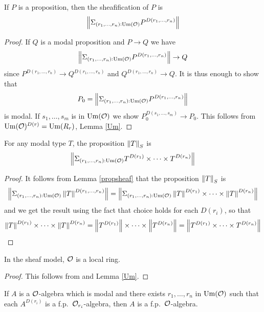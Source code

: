     \begin{lemma}\label{propsheaf}
      If $P$ is a proposition, then the sheafification of $P$ is
      $$\left\lVert \Sigma_{(r_1,\dots,r_n):\mathrm{Um}(\mathcal O)}P^{D(r_1,\dots,r_n)} \right\rVert$$
    \end{lemma}
    
    \begin{proof}
      If $Q$ is a modal proposition and $P\rightarrow Q$ we have
      $$\left\lVert \Sigma_{(r_1,\dots,r_n):\mathrm{Um}(\mathcal O)}P^{D(r_1,\dots,r_n)} \right\rVert\rightarrow Q$$
      since
      $P^{D(r_1,\dots,r_n)}\rightarrow Q^{D(r_1,\dots,r_n)}$ and $Q^{D(r_1,\dots,r_n)}\rightarrow Q$.
      It is thus enough to show that
      $$P_0 = \left\lVert \Sigma_{(r_1,\dots,r_n):\mathrm{Um}(\mathcal O)}P^{D(r_1,\dots,r_n)} \right\rVert$$
      is modal.
      If $s_1,\dots,s_m$ is in $\mathrm{Um}(\mathcal O)$ we show $P_0^{D(s_1,\dots,s_m)}\rightarrow P_0$. This follows
      from $\mathrm{Um}(\mathcal O)^{D(r)} = \mathrm{Um}(R_r)$, Lemma \ref{Um}.
    \end{proof}
    

    \begin{proposition}\label{norm}
      For any modal type $T$, the proposition $\left\lVert T \right\rVert_S$ is
      $$\left\lVert \Sigma_{(r_1,\dots,r_n):\mathrm{Um}(\mathcal O)}T^{D(r_1)}\times\dots\times T^{D(r_n)} \right\rVert$$
    \end{proposition}
    
    \begin{proof}
      It follows from Lemma \ref{propsheaf} that the proposition $\left\lVert T \right\rVert_S$ is
      $$\left\lVert \Sigma_{(r_1,\dots,r_n):\mathrm{Um}(\mathcal O)}\left\lVert T \right\rVert^{D(r_1,\dots,r_n)} \right\rVert = \left\lVert \Sigma_{(r_1,\dots,r_n):\mathrm{Um}(\mathcal O)}\left\lVert T \right\rVert^{D(r_1)}\times\dots\times\left\lVert T \right\rVert^{D(r_n)} \right\rVert$$
      and we get the result using the fact that choice holds for each $D(r_i)$, so that
      \[\left\lVert T \right\rVert^{D(r_1)}\times\dots\times\left\lVert T \right\rVert^{D(r_n)} = \left\lVert T^{D(r_1)} \right\rVert\times\dots\times\left\lVert T^{D(r_n)} \right\rVert =
        \left\lVert T^{D(r_1)}\times\dots\times T^{D(r_n)} \right\rVert\]
    \end{proof}
    
    \begin{proposition}
      In the sheaf model, $\mathcal O$ is a local ring.
    \end{proposition}

    \begin{proof}
      This follows from  and Lemma \ref{Um}.
    \end{proof}

    \begin{lemma}\label{localfp}
      If $A$ is a $\mathcal O$-algebra which is modal and there exists $r_1,\dots,r_n$ in $\mathrm{Um}(\mathcal O)$ such that each
      $A^{D(r_i)}$ is a f.p.\ $\mathcal O_{r_i}$-algebra, then $A$ is a f.p.\ $\mathcal O$-algebra.
    \end{lemma}
    
